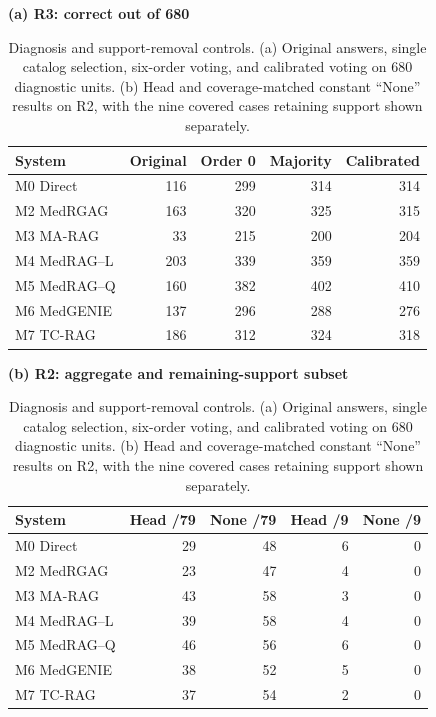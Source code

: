 \begin{table}[tb]
\centering
\small
\caption{Diagnosis and support-removal controls. (a) Original answers, single catalog selection, six-order voting, and calibrated voting on 680 diagnostic units. (b) Head and coverage-matched constant ``None'' results on R2, with the nine covered cases retaining support shown separately.}
\label{tab:head-controls}
\textbf{(a) R3: correct out of 680}\par\smallskip
\begin{tabular*}{\linewidth}{@{\extracolsep{\fill}}lrrrr@{}}
\toprule
System & Original & Order 0 & Majority & Calibrated \\
\midrule
M0 Direct & 116 & 299 & 314 & 314 \\
M2 MedRGAG & 163 & 320 & 325 & 315 \\
M3 MA-RAG & 33 & 215 & 200 & 204 \\
M4 MedRAG--L & 203 & 339 & 359 & 359 \\
M5 MedRAG--Q & 160 & 382 & 402 & 410 \\
M6 MedGENIE & 137 & 296 & 288 & 276 \\
M7 TC-RAG & 186 & 312 & 324 & 318 \\
\bottomrule
\end{tabular*}
\medskip
\textbf{(b) R2: aggregate and remaining-support subset}\par\smallskip
\begin{tabular*}{\linewidth}{@{\extracolsep{\fill}}lrrrr@{}}
\toprule
System & Head /79 & None /79 & Head /9 & None /9 \\
\midrule
M0 Direct & 29 & 48 & 6 & 0 \\
M2 MedRGAG & 23 & 47 & 4 & 0 \\
M3 MA-RAG & 43 & 58 & 3 & 0 \\
M4 MedRAG--L & 39 & 58 & 4 & 0 \\
M5 MedRAG--Q & 46 & 56 & 6 & 0 \\
M6 MedGENIE & 38 & 52 & 5 & 0 \\
M7 TC-RAG & 37 & 54 & 2 & 0 \\
\bottomrule
\end{tabular*}
\end{table}
